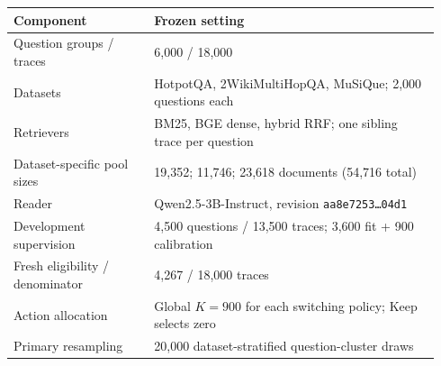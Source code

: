 \begin{tabular}{p{0.31\linewidth}p{0.63\linewidth}}
\toprule
Component & Frozen setting \\
\midrule
Question groups / traces & 6,000 / 18,000 \\
Datasets & HotpotQA, 2WikiMultiHopQA, MuSiQue; 2,000 questions each \\
Retrievers & BM25, BGE dense, hybrid RRF; one sibling trace per question \\
Dataset-specific pool sizes & 19,352; 11,746; 23,618 documents (54,716 total) \\
Reader & Qwen2.5-3B-Instruct, revision \texttt{aa8e7253\ldots 04d1} \\
Development supervision & 4,500 questions / 13,500 traces; 3,600 fit + 900 calibration \\
Fresh eligibility / denominator & 4,267 / 18,000 traces \\
Action allocation & Global $K=900$ for each switching policy; Keep selects zero \\
Primary resampling & 20,000 dataset-stratified question-cluster draws \\
\bottomrule
\end{tabular}
